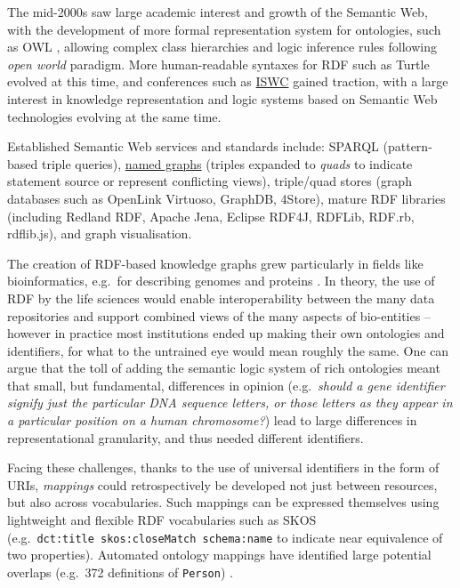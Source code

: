 \documentclass[fleqn,10pt,NOlineno]{wlpeerjlua}
\begin{document}
The mid-2000s saw large academic interest and growth of the Semantic Web, with the development of more formal representation system for ontologies, such as OWL \autocite{w3-owl2-overview}, allowing complex class hierarchies and logic inference rules following \emph{open world} paradigm.
More human-readable syntaxes for RDF such as Turtle evolved at this time, and conferences such as \href{https://iswc2022.semanticweb.org/}{ISWC} \autocite{horrocksSemanticWebISWC2002} gained traction, with a large interest in knowledge representation and logic systems based on Semantic Web technologies evolving at the same time.

Established Semantic Web services and standards include: SPARQL \autocite{w3-sparql11-overview} (pattern-based triple queries), \href{https://www.w3.org/TR/rdf11-concepts/\#section-dataset}{named graphs} \autocite{w3-rdf11-concepts} (triples expanded to \emph{quads} to indicate statement source or represent conflicting views), triple/quad stores (graph databases such as OpenLink Virtuoso, GraphDB, 4Store), mature RDF libraries (including Redland RDF, Apache Jena, Eclipse RDF4J, RDFLib, RDF.rb, rdflib.js), and  graph visualisation.

The creation of RDF-based knowledge graphs grew particularly in fields like bioinformatics, e.g.~for describing genomes and proteins \autocite{gobleStateNationData2008c,williamsOpenPHACTSSemantic2012c}. In theory, the use of RDF by the life sciences would enable interoperability between the many data repositories and support combined views of the many aspects of bio-entities -- however in practice most institutions ended up making their own ontologies and identifiers, for what to the untrained eye would mean roughly the same. One can argue that the toll of adding the semantic logic system of rich ontologies meant that small, but fundamental, differences in opinion (e.g.~\emph{should a gene identifier signify just the particular DNA sequence letters, or those letters as they appear in a particular position on a human chromosome?}) lead to large differences in representational granularity, and thus needed different identifiers.

Facing these challenges, thanks to the use of universal identifiers in the form of URIs, \emph{mappings} could retrospectively be developed not just between resources, but also across vocabularies. Such mappings can be expressed themselves using lightweight and flexible RDF vocabularies such as SKOS \autocite{w3-skos-primer} (e.g.~\texttt{dct:title\ skos:closeMatch\ schema:name} to indicate near equivalence of two properties). Automated ontology mappings have identified large potential overlaps (e.g.~372 definitions of \texttt{Person}) \autocite{huHowMatchableAre2011a}.
\end{document}
